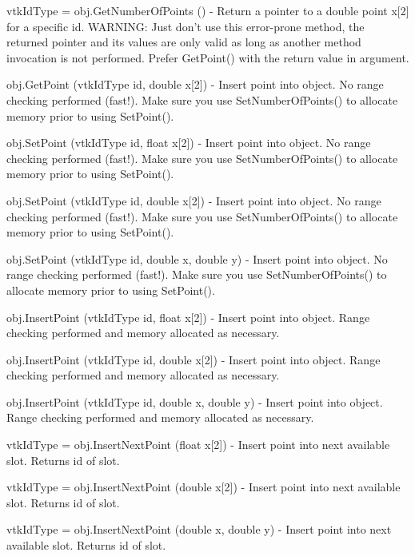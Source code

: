 \begin{DoxyItemize}
\item {\ttfamily vtk\-Id\-Type = obj.\-Get\-Number\-Of\-Points ()} -\/ Return a pointer to a double point x\mbox{[}2\mbox{]} for a specific id. W\-A\-R\-N\-I\-N\-G\-: Just don't use this error-\/prone method, the returned pointer and its values are only valid as long as another method invocation is not performed. Prefer Get\-Point() with the return value in argument.  
\item {\ttfamily obj.\-Get\-Point (vtk\-Id\-Type id, double x\mbox{[}2\mbox{]})} -\/ Insert point into object. No range checking performed (fast!). Make sure you use Set\-Number\-Of\-Points() to allocate memory prior to using Set\-Point().  
\item {\ttfamily obj.\-Set\-Point (vtk\-Id\-Type id, float x\mbox{[}2\mbox{]})} -\/ Insert point into object. No range checking performed (fast!). Make sure you use Set\-Number\-Of\-Points() to allocate memory prior to using Set\-Point().  
\item {\ttfamily obj.\-Set\-Point (vtk\-Id\-Type id, double x\mbox{[}2\mbox{]})} -\/ Insert point into object. No range checking performed (fast!). Make sure you use Set\-Number\-Of\-Points() to allocate memory prior to using Set\-Point().  
\item {\ttfamily obj.\-Set\-Point (vtk\-Id\-Type id, double x, double y)} -\/ Insert point into object. No range checking performed (fast!). Make sure you use Set\-Number\-Of\-Points() to allocate memory prior to using Set\-Point().  
\item {\ttfamily obj.\-Insert\-Point (vtk\-Id\-Type id, float x\mbox{[}2\mbox{]})} -\/ Insert point into object. Range checking performed and memory allocated as necessary.  
\item {\ttfamily obj.\-Insert\-Point (vtk\-Id\-Type id, double x\mbox{[}2\mbox{]})} -\/ Insert point into object. Range checking performed and memory allocated as necessary.  
\item {\ttfamily obj.\-Insert\-Point (vtk\-Id\-Type id, double x, double y)} -\/ Insert point into object. Range checking performed and memory allocated as necessary.  
\item {\ttfamily vtk\-Id\-Type = obj.\-Insert\-Next\-Point (float x\mbox{[}2\mbox{]})} -\/ Insert point into next available slot. Returns id of slot.  
\item {\ttfamily vtk\-Id\-Type = obj.\-Insert\-Next\-Point (double x\mbox{[}2\mbox{]})} -\/ Insert point into next available slot. Returns id of slot.  
\item {\ttfamily vtk\-Id\-Type = obj.\-Insert\-Next\-Point (double x, double y)} -\/ Insert point into next available slot. Returns id of slot.  

\end{DoxyItemize}
